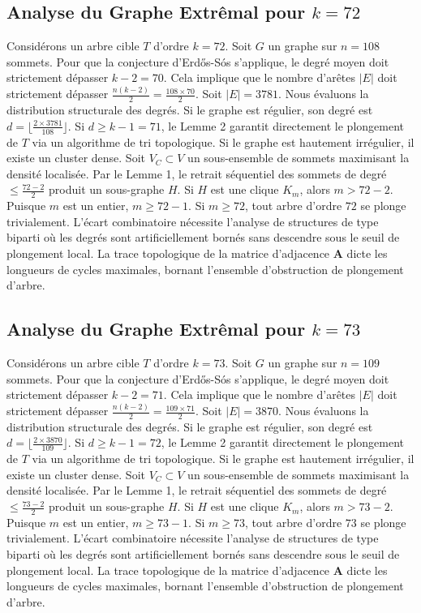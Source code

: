 \documentclass[11pt,a4paper]{article}
\begin{document}
\subsection{Analyse du Graphe Extr\^emal pour $k=72$}
Consid\'erons un arbre cible $T$ d'ordre $k=72$.
Soit $G$ un graphe sur $n=108$ sommets.
Pour que la conjecture d'Erd\H{o}s-S\'os s'applique, le degr\'e moyen doit strictement d\'epasser $k-2 = 70$.
Cela implique que le nombre d'ar\^etes $|E|$ doit strictement d\'epasser $\frac{n(k-2)}{2} = \frac{108 \times 70}{2}$.
Soit $|E| = 3781$.
Nous \'evaluons la distribution structurale des degr\'es. Si le graphe est r\'egulier, son degr\'e est $d = \lfloor \frac{2 \times 3781}{108} \rfloor$.
Si $d \geq k-1 = 71$, le Lemme 2 garantit directement le plongement de $T$ via un algorithme de tri topologique.
Si le graphe est hautement irr\'egulier, il existe un cluster dense. Soit $V_C \subset V$ un sous-ensemble de sommets maximisant la densit\'e localis\'ee.
Par le Lemme 1, le retrait s\'equentiel des sommets de degr\'e $\leq \frac{72-2}{2}$ produit un sous-graphe $H$.
Si $H$ est une clique $K_{m}$, alors $m > 72-2$. Puisque $m$ est un entier, $m \geq 72-1$. Si $m \geq 72$, tout arbre d'ordre $72$ se plonge trivialement.
L'\'ecart combinatoire n\'ecessite l'analyse de structures de type biparti o\`u les degr\'es sont artificiellement born\'es sans descendre sous le seuil de plongement local. La trace topologique de la matrice d'adjacence $\mathbf{A}$ dicte les longueurs de cycles maximales, bornant l'ensemble d'obstruction de plongement d'arbre.


\subsection{Analyse du Graphe Extr\^emal pour $k=73$}
Consid\'erons un arbre cible $T$ d'ordre $k=73$.
Soit $G$ un graphe sur $n=109$ sommets.
Pour que la conjecture d'Erd\H{o}s-S\'os s'applique, le degr\'e moyen doit strictement d\'epasser $k-2 = 71$.
Cela implique que le nombre d'ar\^etes $|E|$ doit strictement d\'epasser $\frac{n(k-2)}{2} = \frac{109 \times 71}{2}$.
Soit $|E| = 3870$.
Nous \'evaluons la distribution structurale des degr\'es. Si le graphe est r\'egulier, son degr\'e est $d = \lfloor \frac{2 \times 3870}{109} \rfloor$.
Si $d \geq k-1 = 72$, le Lemme 2 garantit directement le plongement de $T$ via un algorithme de tri topologique.
Si le graphe est hautement irr\'egulier, il existe un cluster dense. Soit $V_C \subset V$ un sous-ensemble de sommets maximisant la densit\'e localis\'ee.
Par le Lemme 1, le retrait s\'equentiel des sommets de degr\'e $\leq \frac{73-2}{2}$ produit un sous-graphe $H$.
Si $H$ est une clique $K_{m}$, alors $m > 73-2$. Puisque $m$ est un entier, $m \geq 73-1$. Si $m \geq 73$, tout arbre d'ordre $73$ se plonge trivialement.
L'\'ecart combinatoire n\'ecessite l'analyse de structures de type biparti o\`u les degr\'es sont artificiellement born\'es sans descendre sous le seuil de plongement local. La trace topologique de la matrice d'adjacence $\mathbf{A}$ dicte les longueurs de cycles maximales, bornant l'ensemble d'obstruction de plongement d'arbre.
\end{document}
